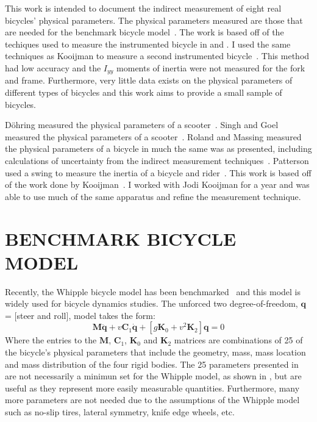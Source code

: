 \documentclass{bmd2010p}
\begin{document}
This work is intended to document the indirect measurement of eight real
bicycles' physical parameters. The physical parameters measured are those that
are needed for the benchmark bicycle model~\cite{Meijaard2007}. The work is
based off of the techiques used to measure the instrumented bicycle in
\cite{Kooijman2006} and \cite{Kooijman2008}. I used the same techniques as
Kooijman to measure a second instrumented bicycle~\cite{Moore2009a}. This
method had low accuracy and the $I_{yy}$ moments of inertia were
not measured for the fork and frame. Furthermore, very little data exists on
the physical parameters of different types of bicycles and this work aims to
provide a small sample of bicycles.

D\"{o}hring measured the physical parameters of a scooter~\cite{Dohring1953}.
Singh and Goel measured the physical parameters of a scooter~\cite{Singh1971}.
Roland and Massing measured the physical parameters of a bicycle in much the
same was as presented, including calculations of uncertainty from the indirect
measurement techniques~\cite{Roland1971}. Patterson used a swing to measure the
inertia of a bicycle and rider~\cite{Patterson2004}. This work is based off of the work
done by Kooijman~\cite{Kooijman2006}. I worked with Jodi Kooijman for a year and
was able to use much of the same apparatus and refine the measurement
technique.
\section{BENCHMARK BICYCLE MODEL}
Recently, the Whipple bicycle model has been benchmarked~\cite{Meijaard2007}
and this model is widely used for bicycle dynamics studies. The unforced two
degree-of-freedom, $\mathbf{q}$ = [steer and roll], model takes the form:
\begin{equation}
    \mathbf{M\ddot{q}}
    +v\mathbf{C}_1\mathbf{\dot{q}}
    +\left[g\mathbf{K}_0
    +v^2\mathbf{K}_2\right]\mathbf{q}
    =0
    \label{eq:canonical}
\end{equation}
Where the entries to the $\mathbf{M}$, $\mathbf{C}_1$, $\mathbf{K}_0$ and $\mathbf{K}_2$
matrices are combinations of 25 of the bicycle's physical parameters that
include the geometry, mass, mass location and mass distribution of the four
rigid bodies. The 25 parameters presented in \cite{Meijaard2007} are not
necessarily a minimun set for the Whipple model, as shown in \cite{Sharp2008},
but are useful as they represent more easily measurable quantities.
Furthermore, many more parameters are not needed due to the assumptions of the
Whipple model such as no-slip tires, lateral symmetry, knife edge wheels, etc.
\end{document}
